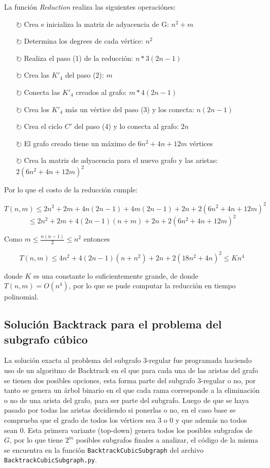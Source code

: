 \documentclass{article}
\begin{document}
La funci\'on \textit{Reduction} realiza las siguientes operaci\'ones: 

\begin{itemize}
    \item[$\circlearrowright $] Crea e inicializa la matriz de adyacencia de G: $n^2 + m$
    \item[$\circlearrowright $] Determina los degrees de cada v\'ertice: $n^2$
    \item[$\circlearrowright $] Realiza el paso (1) de la reducci\'on: $n * 3(2n-1)$
    \item[$\circlearrowright $] Crea las $K'_4$ del paso (2): $m$
    \item[$\circlearrowright $] Conecta las $K'_4$ creados al grafo: $m * 4(2n-1)$
    \item[$\circlearrowright $] Crea los $K'_4$ m\'as un v\'ertice del paso (3) y los conecta: $n(2n -1) $
    \item[$\circlearrowright $] Crea el ciclo $C'$ del paso (4) y lo conecta al grafo: $2n$
    \item[$\circlearrowright $] El grafo creado tiene un m\'aximo de $6n^2 + 4n + 12m$ v\'ertices
    \item[$\circlearrowright $] Crea la matriz de adyacencia para el nuevo grafo y las aristas: $2(6n^2 + 4n + 12m)^2$
\end{itemize}

Por lo que el costo de la reducci\'on cumple:

$$T(n,m) \leq 2n^2 + 2m + 4n(2n-1) + 4m(2n-1) + 2n + 2(6n^2 + 4n + 12m)^2$$
$$\leq 2n^2 + 2m + 4(2n-1)(n+m) + 2n + 2(6n^2 + 4n + 12m)^2$$

Como $m \leq \frac{n(n-1)}{2} \leq n^2$ entonces

$$T(n,m) \leq 4n^2 + 4(2n-1)(n+n^2) + 2n + 2(18n^2 + 4n)^2 \leq Kn^4$$ 

donde $K$ es una constante lo suficientemente grande, de donde $T(n,m) = O(n^4)$, por lo 
que se pude computar la reducci\'on en tiempo polinomial.

\subsection*{Soluci\'on Backtrack para el problema del subgrafo c\'ubico}
La soluci\'on exacta al problema del subgrafo $3$-regular fue programada haciendo uso de un algoritmo de Backtrack en el que para cada una de las aristas del grafo se tienen 
dos posibles opciones, esta forma parte del subgrafo $3$-regular o no, por tanto se genera un \'arbol binario en el que cada rama corresponde a la eliminaci\'on o no de una arista
del grafo, para ser parte del subgrafo. Luego de que se haya pasado por todas las aristas decidiendo si ponerlas o no, en el caso base se comprueba que el grado de todos los v\'ertices sea $3$ o $0$
y que adem\'as no todos sean $0$. Esta primera variante (top-down) genera todos los posibles subgrafos de $G$, por lo que tiene $2^m$ posibles subgrafos finales a analizar, el c\'odigo de la misma se encuentra
en la funci\'on \texttt{BacktrackCubicSubgraph} del archivo \texttt{BacktrackCubicSubgraph.py}.\\ 
\end{document}
